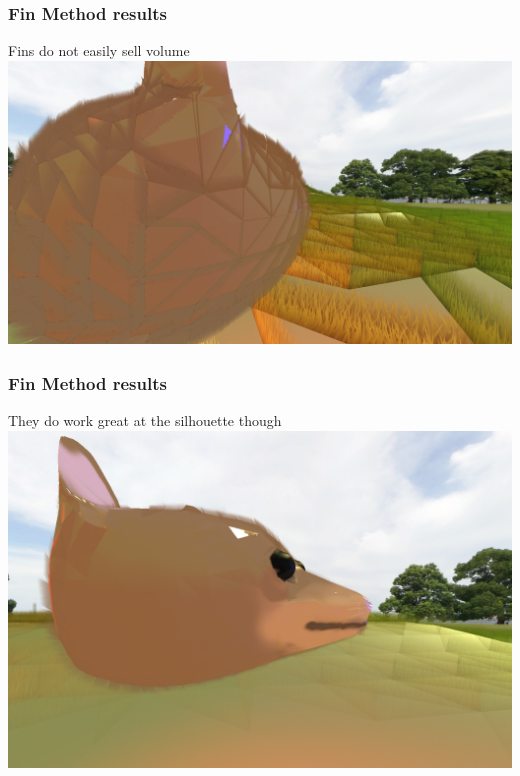\documentclass[12pt]{beamer}
\begin{document}
    \begin{frame}
        \frametitle{ Fin Method results }
        Fins do not easily sell volume
        \includegraphics[width=\textwidth]{fullfins}
    \end{frame}
    \begin{frame}
        \frametitle{ Fin Method results }
        They do work great at the silhouette though
        \includegraphics[width=\textwidth]{fins}
    \end{frame}
\end{document}
